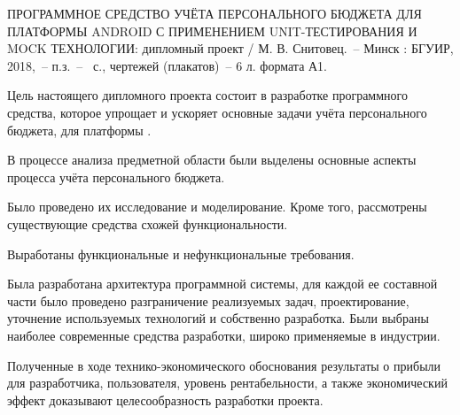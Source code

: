 \thispagestyle{empty}


\MakeUppercase{Программное средство учёта персонального бюджета для платформы Android с применением Unit-\-тес\-ти\-ро\-ва\-ния и Mock технологии}: дипломный проект / М. В. Снитовец.~-- Минск : БГУИР, 2018,~-- п.з.~-- \totalpages~с., чертежей (плакатов)~-- 6 л. формата А1.

Цель настоящего дипломного проекта состоит в  разработке программного средства, которое упрощает и ускоряет основные задачи учёта персонального бюджета, для платформы \andro.

В процессе анализа предметной области были выделены основные аспекты процесса учёта персонального бюджета.

Было проведено их исследование и моделирование.
Кроме того, рассмотрены существующие средства схожей функциональности.

Выработаны функциональные и нефункциональные требования.

Была разработана архитектура программной системы, для каждой ее составной части было проведено разграничение реализуемых задач, проектирование, уточнение используемых технологий и собственно разработка.
Были выбраны наиболее современные средства разработки, широко применяемые в индустрии.

Полученные в ходе технико-экономического обоснования результаты о прибыли для разработчика, пользователя, уровень рентабельности, а также экономический эффект доказывают целесообразность разработки про\-екта.
